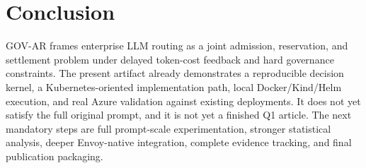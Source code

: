 \documentclass[10pt,journal,compsoc]{IEEEtran}
\begin{document}
\section{Conclusion}
GOV-AR frames enterprise LLM routing as a joint admission, reservation, and
settlement problem under delayed token-cost feedback and hard governance
constraints. The present artifact already demonstrates a reproducible decision
kernel, a Kubernetes-oriented implementation path, local Docker/Kind/Helm
execution, and real Azure validation against existing deployments. It does not
yet satisfy the full original prompt, and it is not yet a finished Q1 article.
The next mandatory steps are full prompt-scale experimentation, stronger
statistical analysis, deeper Envoy-native integration, complete evidence
tracking, and final publication packaging.



\end{document}
